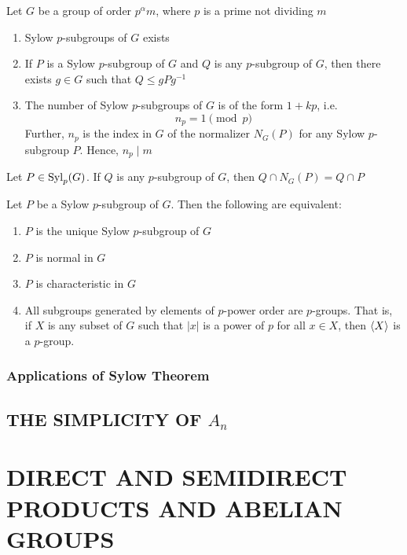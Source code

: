 \begin{theorem}
	Let $G$ be a group of order $p^\alpha m$, where $p$ is a prime not dividing $m$
	\begin{enumerate}
		\item Sylow $p$-subgroups of $G$ exists
		\item If $P$ is a Sylow $p$-subgroup of $G$ and $Q$ is any $p$-subgroup of $G$, then there exists $g \in G$ such that $Q \leq gPg^{-1}$
		\item The number of Sylow $p$-subgroups of $G$ is of the form $1 + kp$, i.e.
		\[
		n_p = 1 \pmod{p}
		\]
		Further, $n_p$ is the index in $G$ of the normalizer $N_G(P)$ for any Sylow $p$-subgroup $P$. Hence, $n_p \mid m$
	\end{enumerate}
\end{theorem}

\begin{lemma}
	Let $P \in \operatorname{Syl}_p(G)$. If $Q$ is any $p$-subgroup of $G$, then $Q \cap N_G(P) = Q \cap P$
\end{lemma}

\begin{corollary}
	Let $P$ be a Sylow $p$-subgroup of $G$. Then the following are equivalent:
	\begin{enumerate}
		\item $P$ is the unique Sylow $p$-subgroup of $G$
		\item $P$ is normal in $G$
		\item $P$ is characteristic in $G$
		\item All subgroups generated by elements of $p$-power order are $p$-groups. That is, if $X$ is any subset of $G$ such that $|x|$ is a power of $p$ for all $x \in X$, then $\langle X\rangle$ is a $p$-group.
	\end{enumerate}
\end{corollary}

\subsubsection{Applications of Sylow Theorem}

\subsection{THE SIMPLICITY OF $A_n$}

\section{DIRECT AND SEMIDIRECT PRODUCTS AND ABELIAN GROUPS}

